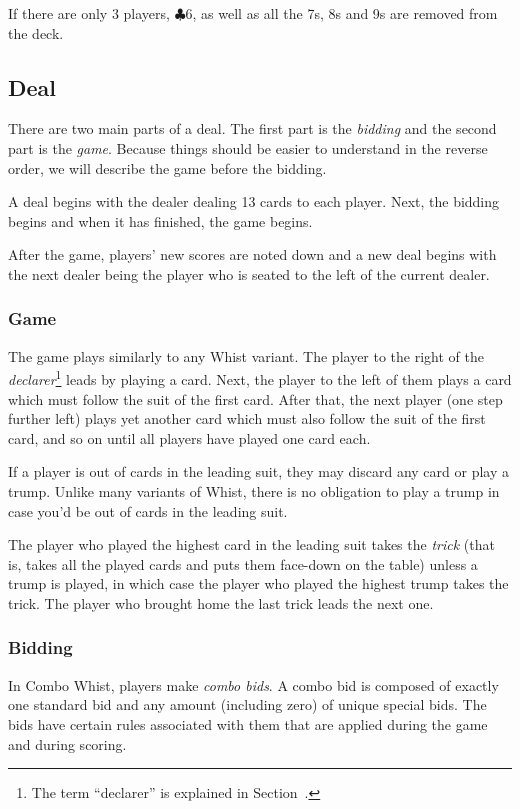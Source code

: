 \documentclass[a4paper]{article}
\begin{document}
			If there are only 3 players, $\clubsuit 6$, as well as all the 7s, 8s and 9s are removed from the deck.

		\subsection{Deal}
			There are two main parts of a deal. The first part is the \emph{bidding} and the second part is the \emph{game}. Because things should be easier to understand in the reverse order, we will describe the game before the bidding.

			A deal begins with the dealer dealing 13 cards to each player. Next, the bidding begins and when it has finished, the game begins.

			After the game, players' new scores are noted down and a new deal begins with the next dealer being the player who is seated to the left of the current dealer.

			\subsubsection{Game}
				The game plays similarly to any Whist variant. The player to the right of the \emph{declarer}\footnote{The term ``declarer'' is explained in Section~.} leads by playing a card. Next, the player to the left of them plays a card which must follow the suit of the first card. After that, the next player (one step further left) plays yet another card which must also follow the suit of the first card, and so on until all players have played one card each.

				If a player is out of cards in the leading suit, they may discard any card or play a trump. Unlike many variants of Whist, there is no obligation to play a trump in case you'd be out of cards in the leading suit.

				The player who played the highest card in the leading suit takes the \emph{trick} (that is, takes all the played cards and puts them face-down on the table) unless a trump is played, in which case the player who played the highest trump takes the trick. The player who brought home the last trick leads the next one.

			\subsubsection{Bidding}
				\label{sec:bidding}
				In Combo Whist, players make \emph{combo bids}. A combo bid is composed of exactly one standard bid and any amount (including zero) of unique special bids. The bids have certain rules associated with them that are applied during the game and during scoring.
\end{document}
